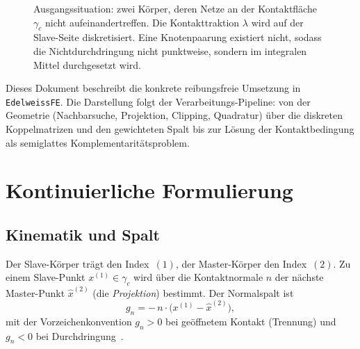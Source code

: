 \documentclass[a4paper,11pt]{article}
\def\bm#1{#1}%
\newcommand{\code}[1]{\texttt{\small #1}}
\let\stdsection\section
\renewcommand{\section}{\clearpage\stdsection}
\begin{document}
\begin{figure}[htbp]
\centering
{}
\caption[Kontaktproblem mit nichtkonformen Netzen]{Ausgangssituation: zwei Körper, deren Netze an
der Kontaktfläche $\gamma_c$ nicht aufeinandertreffen. Die Kontakttraktion $\bm\lambda$ wird auf der
Slave-Seite diskretisiert. Eine Knotenpaarung existiert nicht, sodass die Nichtdurchdringung nicht
punktweise, sondern im integralen Mittel durchgesetzt wird.}
\label{fig:kontaktproblem}
\end{figure}

Dieses Dokument beschreibt die konkrete reibungsfreie Umsetzung in \code{EdelweissFE}. Die Darstellung
folgt der Verarbeitungs-Pipeline: von der Geometrie (Nachbarsuche, Projektion, Clipping,
Quadratur) über die diskreten Koppelmatrizen und den gewichteten Spalt bis zur Lösung der
Kontaktbedingung als semiglattes Komplementaritätsproblem.

\section{Kontinuierliche Formulierung}
\label{sec:kontinuierlich}

\subsection{Kinematik und Spalt}
Der Slave-Körper trägt den Index~$(1)$, der Master-Körper den Index~$(2)$. Zu einem Slave-Punkt
$\bm x^{(1)}\in\gamma_c$ wird über die Kontaktnormale $\bm n$ der nächste Master-Punkt
$\hat{\bm x}^{(2)}$ (die \emph{Projektion}) bestimmt. Der Normalspalt ist
\begin{equation}
g_n = -\,\bm n\cdot\big(\bm x^{(1)} - \hat{\bm x}^{(2)}\big),
\label{eq:gap}
\end{equation}
mit der Vorzeichenkonvention $g_n>0$ bei geöffnetem Kontakt (Trennung) und $g_n<0$ bei
Durchdringung~\citep{wriggers,farah}.
\end{document}
